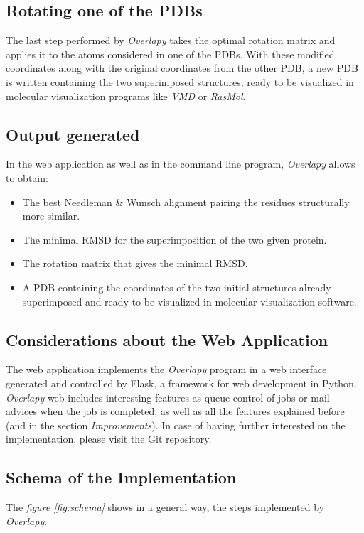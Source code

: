 \documentclass{article}
\begin{document}
\subsection*{\color{gray}Rotating one of the PDBs}
The last step performed by \textit{Overlapy} takes the optimal rotation matrix and applies it to the atoms considered in one of the PDBs. With these modified coordinates along with the original coordinates from the other PDB, a new PDB is written containing the two superimposed structures, ready to be visualized in molecular visualization programs like \textit{VMD}\cite{17} or \textit{RasMol}\cite{18}.

\subsection*{\color{gray}Output generated}
In the web application as well as in the command line program, \textit{Overlapy} allows to obtain:
\begin{itemize}
	\item The best Needleman \& Wunsch alignment pairing the residues structurally more similar.
	\item The minimal RMSD for the superimposition of the two given protein.
	\item The rotation matrix that gives the minimal RMSD.
	\item A PDB containing the coordinates of the two initial structures already superimposed and ready to be visualized in molecular visualization software. 
\end{itemize}

\subsection*{\color{gray}Considerations about the Web Application}
The web application\cite{8} implements the \textit{Overlapy} program in a web interface generated and controlled by Flask\cite{9}, a framework for web development in Python.\\

\textit{Overlapy} web includes interesting features as queue control of jobs or mail advices when the job is completed, as well as all the features explained before (and in the section \textit{Improvements}). In case of having further interested on the implementation, please visit the Git repository\cite{19}.

\pagebreak
\subsection*{\color{gray}Schema of the Implementation}
The \textit{figure \ref{fig:schema}} shows in a general way, the steps implemented by \textit{Overlapy}.
\end{document}
